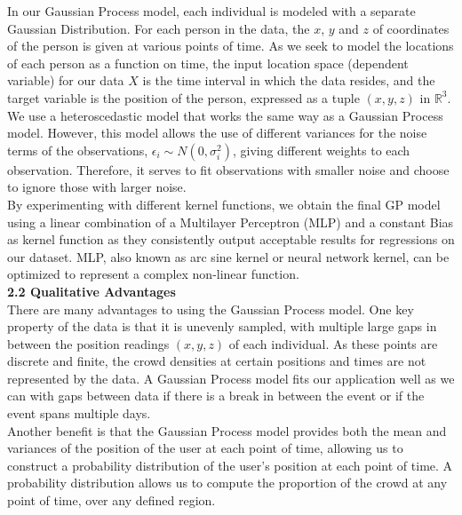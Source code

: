 \documentclass[letterpaper]{article}
\begin{document}
In our Gaussian Process model, each individual is modeled with a separate Gaussian Distribution. For each person in the data, the $x$, $y$ and $z$ of coordinates of the person is given at various points of time. As we seek to model the locations of each person as a function on time, the input location space (dependent variable) for our data $X$ is the time interval in which the data resides, and the target variable is the position of the person, expressed as a tuple $(x,y,z)$ in $\mathbb{R}^3$. \\

We use a heteroscedastic model that works the same way as a Gaussian Process model. However, this model allows the use of different variances for the noise terms of the observations, $\epsilon_i \sim N(0, \sigma_i^2)$, giving different weights to each observation. Therefore, it serves to fit observations with smaller noise and choose to ignore those with larger noise. \\

By experimenting with different kernel functions, we obtain the final GP model using a linear combination of a Multilayer Perceptron (MLP) and a constant Bias as kernel function as they consistently output acceptable results for regressions on our dataset. MLP, also known as arc sine kernel or neural network kernel, can be optimized to represent a complex non-linear function. \\

{\bf2.2  Qualitative Advantages} \\

There are many advantages to using the Gaussian Process model. One key property of the data is that it is unevenly sampled, with multiple large gaps in between the position readings $(x,y,z)$ of each individual. As these points are discrete and finite, the crowd densities at certain positions and times are not represented by the data. A Gaussian Process model fits our application well as we can with gaps between data if there is a break in between the event or if the event spans multiple days. \\

Another benefit is that the Gaussian Process model provides both the mean and variances of the position of the user at each point of time, allowing us to construct a probability distribution of the user's position at each point of time. A probability distribution allows us to compute the proportion of the crowd at any point of time, over any defined region. \\
\end{document}
